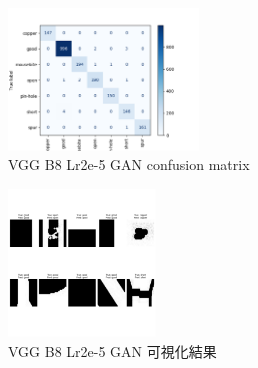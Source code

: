 \begin{figure}[H]
    \centering
    \includegraphics[width=0.45\textwidth]{./img/VGG/P9.png}
    \caption{VGG B8 Lr2e-5 GAN confusion matrix}
    \label{fig:VGG_P9}
\end{figure}
\begin{figure}[H]
    \centering
    \includegraphics[width=0.35\textwidth]{./img/VGG/P10.png}
    \caption{VGG B8 Lr2e-5 GAN 可視化結果}
    \label{fig:VGG_P10}
\end{figure}
%

